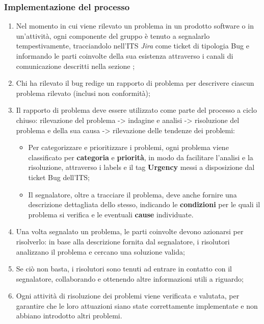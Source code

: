 \documentclass[10pt, a4paper]{article}
\begin{document}
\subsubsection{Implementazione del processo}
\begin{enumerate}
    \item Nel momento in cui viene rilevato un problema in un prodotto software o in un'attività, ogni componente del gruppo è tenuto a segnalarlo tempestivamente, tracciandolo nell'ITS \textit{Jira} 
    come ticket di tipologia Bug e informando le parti coinvolte della sua esistenza attraverso i canali di comunicazione descritti nella sezione ;
    \item Chi ha rilevato il bug redige un rapporto di problema per descrivere ciascun problema rilevato (inclusi non conformità);
    \item Il rapporto di problema deve essere utilizzato come parte del processo a ciclo chiuso: rilevazione del problema -> indagine e analisi -> risoluzione del problema e della sua causa -> rilevazione delle tendenze dei problemi:
    \begin{itemize}
        \item Per categorizzare e prioritizzare i problemi, ogni problema viene classificato per \textbf{categoria} e \textbf{priorità}, in modo da facilitare l'analisi e la risoluzione, attraverso i labels e il tag \textbf{Urgency} messi a disposizione dal ticket Bug dell'ITS;
        \item Il segnalatore, oltre a tracciare il problema, deve anche fornire una descrizione dettagliata dello stesso, indicando le \textbf{condizioni} per le quali il problema si verifica e le eventuali \textbf{cause} individuate.
    \end{itemize}
    \item Una volta segnalato un problema, le parti coinvolte devono azionarsi per risolverlo: in base alla descrizione fornita dal segnalatore, i risolutori analizzano il problema e cercano una soluzione valida;
    \item Se ciò non basta, i risolutori sono tenuti ad entrare in contatto con il segnalatore, collaborando e ottenendo altre informazioni utili a riguardo;
    \item Ogni attività di risoluzione dei problemi viene verificata e valutata, per garantire che le loro attuazioni siano state correttamente implementate e non abbiano introdotto altri problemi.
    
\end{enumerate}
\end{document}
